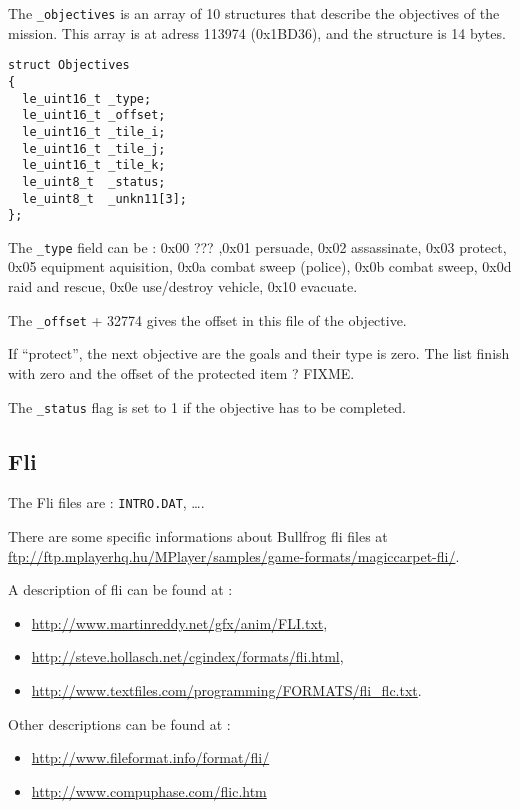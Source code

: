 \documentclass[a4paper,twoside,12pt,dvips]{article}
\begin{document}
The \texttt{\_objectives} is an array of 10 structures that describe the objectives of the mission. This array is at adress 113974 (0x1BD36), and the structure is 14 bytes.

\begin{lstlisting}
struct Objectives
{
  le_uint16_t _type;
  le_uint16_t _offset;
  le_uint16_t _tile_i;
  le_uint16_t _tile_j;
  le_uint16_t _tile_k;
  le_uint8_t  _status;
  le_uint8_t  _unkn11[3];
};
\end{lstlisting}

The \texttt{\_type} field can be : 0x00 ??? ,0x01 persuade, 0x02 assassinate, 0x03 protect, 0x05 equipment aquisition, 0x0a combat sweep (police), 0x0b combat sweep, 0x0d raid and rescue, 0x0e use/destroy vehicle, 0x10 evacuate. 

The \texttt{\_offset} + 32774 gives the offset in this file of the objective.

If ``protect'', the next objective are the goals and their type is zero. The list finish with zero and the offset of the protected item ? FIXME.

The \texttt{\_status} flag is set to 1 if the objective has to be completed.


\subsection{Fli}
\label{sec:fli}

The Fli files are : \texttt{INTRO.DAT}, \dots. 

There are some specific informations about Bullfrog fli files at \href{ftp://ftp.mplayerhq.hu/MPlayer/samples/game-formats/magiccarpet-fli/}{ftp://ftp.mplayerhq.hu/MPlayer/samples/game-formats/magiccarpet-fli/}.

A description of fli can be found at :
\begin{itemize}
\item \href{http://www.martinreddy.net/gfx/anim/FLI.txt}{http://www.martinreddy.net/gfx/anim/FLI.txt},
\item \href{http://steve.hollasch.net/cgindex/formats/fli.html}{http://steve.hollasch.net/cgindex/formats/fli.html},
\item \href{http://www.textfiles.com/programming/FORMATS/fli\_flc.txt}{http://www.textfiles.com/programming/FORMATS/fli\_flc.txt}.
\end{itemize}

Other descriptions can be found at :
\begin{itemize}
\item \href{http://www.fileformat.info/format/fli/}{http://www.fileformat.info/format/fli/}
\item \href{http://www.compuphase.com/flic.htm}{http://www.compuphase.com/flic.htm}
\end{itemize}
\end{document}
